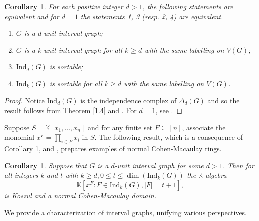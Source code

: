 \documentclass[12pt,reqno]{amsart}
\theoremstyle{plain}
\newtheorem{corollary}[theorem]{Corollary}
\theoremstyle{definition}
\numberwithin{equation}{section}
\begin{document}
 \begin{corollary} \label{B}
For each positive integer $d>1$, the following statements are equivalent and for $d=1$ the statements 1, 3  (resp. 2, 4) are equivalent.
\begin{enumerate}
\item $G$ is a $d$-unit interval graph;
\item $G$ is a $k$-unit interval graph for all $k\geq d$ with the same labelling on $V(G)$;
\item $\mathrm{Ind}_d(G)$ is sortable;
\item $\mathrm{Ind}_k(G)$ is sortable for all $k\geq d$ with the same labelling on $V(G)$.
\end{enumerate}
\end{corollary}
\begin{proof}
Notice $\mathrm{Ind}_d(G)$ is the independence complex of $\Delta_d(G)$ and so the result follows from Theorem \ref{1.4} and \cite[Theorem 1.1]{F+M}. For $d=1$, see \cite[Theorem 8]{Fahimeh}.
\end{proof}

Suppose $S=\mathbb{K}[x_1, \dots , x_n]$ and for any finite set $F\subseteq [n]$, associate the monomial $x^F=\prod_{i\in F}x_i$ in $S$.
The following result, which is a consequence of Corollary \ref{B}, 
and \cite[Corollary 13]{Fahimeh}, prepares examples of  normal Cohen-Macaulay rings.

\begin{corollary}\label{CM}
Suppose that $G$ is a $d$-unit interval graph for some $d>1$. Then for all integers $k$ and $t$ with $k\geq d, 0\leq t\leq \dim (\mathrm{Ind}_k(G))$ the $\mathbb{K}$-algebra
$$\mathbb{K}[x^F : F\in \mathrm{Ind}_k(G) , |F|=t+1],$$
is Koszul and a normal Cohen-Macaulay domain.
\end{corollary}

We provide a characterization of interval graphs, unifying various perspectives.
\end{document}
